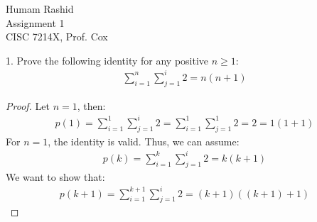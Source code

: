 \documentclass{scrartcl}
\begin{document}
\begin{flushleft}

    Humam Rashid\\
    Assignment 1\\
    CISC 7214X, Prof. Cox\\
    \bigskip
    
    1. Prove the following identity for any positive $n \geq 1$:
    \begin{align*}
        \sum_{i=1}^{n}\sum_{j=1}^{i} 2 = n (n + 1)
    \end{align*}

    \begin{proof}
        Let $n = 1$, then:
        \begin{align}
            p(1) = \sum_{i=1}^{1}\sum_{j=1}^{i} 2 = \sum_{i=1}^{1}\sum_{j=1}^{1} 2 = 2 = 1 (1 + 1)
        \end{align}
        For $n = 1$, the identity is valid. Thus, we can assume:
        \begin{align}
            p(k) = \sum_{i=1}^{k}\sum_{j=1}^{i} 2 = k (k + 1)
        \end{align}
        We want to show that:
        \begin{align}
            p(k + 1) = \sum_{i=1}^{k + 1}\sum_{j=1}^{i} 2 = (k + 1) ((k + 1) + 1)
        \end{align}
    \end{proof}

\end{flushleft}
\end{document}
